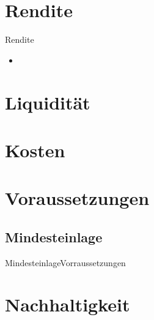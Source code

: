 \documentclass[10pt,a4paper, ngerman]{beamer}
\begin{document}
\section{Rendite}
\begin{frame}{Rendite}
\begin{itemize}
	\item 
\end{itemize}
\end{frame}

\section{Liquidität}


\section{Kosten}


\section{Voraussetzungen}
\subsection{Mindesteinlage}
\begin{frame}{Mindesteinlage}{Vorraussetzungen}

\end{frame}


\section{Nachhaltigkeit}
\end{document}
